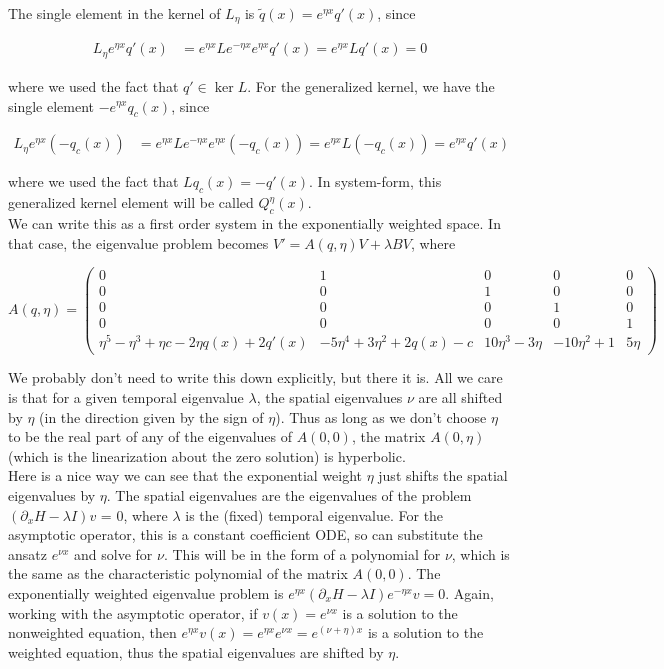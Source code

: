 \documentclass[12pt]{article}
\begin{document}
The single element in the kernel of $L_\eta$ is $\tilde{q}(x) = e^{\eta x} q'(x)$, since

\begin{align*}
L_\eta e^{\eta x} q'(x) &= e^{\eta x} L e^{-\eta x} e^{\eta x} q'(x) = e^{\eta x} L q'(x) = 0
\end{align*}

where we used the fact that $q' \in \ker L$. For the generalized kernel, we have the single element $-e^{\eta x} q_c(x)$, since

\begin{align*}
L_\eta e^{\eta x} (-q_c(x)) &= e^{\eta x} L e^{-\eta x} e^{\eta x} (-q_c(x)) = e^{\eta x} L (-q_c(x)) = e^{\eta x} q'(x)
\end{align*}

where we used the fact that $L q_c(x) = -q'(x)$. In system-form, this generalized kernel element will be called $Q^\eta_c(x)$.\\

We can write this as a first order system in the exponentially weighted space. In that case, the eigenvalue problem becomes $V' = A(q, \eta)V + \lambda B V$, where

\[
A(q, \eta) = 
\begin{pmatrix}0 & 1 & 0 & 0 & 0 \\0 & 0 & 1 & 0 & 0 \\0 & 0 & 0 & 1 & 0 \\0 & 0 & 0 & 0 & 1 \\
\eta^5 - \eta^3 + \eta c - 2 \eta q(x) + 2q'(x) & -5\eta^4 + 3\eta^2 + 2q(x) - c & 10\eta^3 - 3\eta & -10\eta^2 + 1 & 5\eta \end{pmatrix} 
\]

We probably don't need to write this down explicitly, but there it is. All we care is that for a given temporal eigenvalue $\lambda$, the spatial eigenvalues $\nu$ are all shifted by $\eta$ (in the direction given by the sign of $\eta$). Thus as long as we don't choose $\eta$ to be the real part of any of the eigenvalues of $A(0, 0)$, the matrix $A(0, \eta)$ (which is the linearization about the zero solution) is hyperbolic.\\

Here is a nice way we can see that the exponential weight $\eta$ just shifts the spatial eigenvalues by $\eta$. The spatial eigenvalues are the eigenvalues of the problem $(\partial_x H - \lambda I)v$ = 0, where $\lambda$ is the (fixed) temporal eigenvalue. For the asymptotic operator, this is a constant coefficient ODE, so can substitute the ansatz $e^{\nu x}$ and solve for $\nu$. This will be in the form of a polynomial for $\nu$, which is the same as the characteristic polynomial of the matrix $A(0,0)$. The exponentially weighted eigenvalue problem is $e^{\eta x} (\partial_x H - \lambda I)e^{-\eta x}v = 0$. Again, working with the asymptotic operator, if $v(x) = e^{\nu x}$ is a solution to the nonweighted equation, then $e^{\eta x}v(x) = e^{\eta x}e^{\nu x} = e^{(\nu + \eta)x}$ is a solution to the weighted equation, thus the spatial eigenvalues are shifted by $\eta$.
\end{document}
